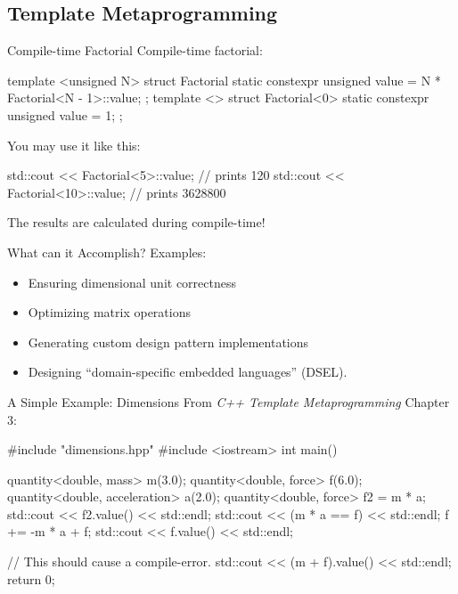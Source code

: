 \subsection{Template Metaprogramming}

\begin{frame}[fragile]{Compile-time Factorial}
    Compile-time factorial:
    \begin{cpp}
template <unsigned N>
struct Factorial {
  static constexpr unsigned value
      = N * Factorial<N - 1>::value;
};
template <>
struct Factorial<0> {
  static constexpr unsigned value = 1;
};
    \end{cpp}
    You may use it like this:
    \begin{cpp}
std::cout << Factorial<5>::value;  // prints 120
std::cout << Factorial<10>::value; // prints 3628800
    \end{cpp}
    The results are calculated during compile-time!
\end{frame}

\begin{frame}{What can it Accomplish?}
    Examples:
    \begin{itemize}
        \item Ensuring dimensional unit correctness
        \item Optimizing matrix operations
        \item Generating custom design pattern implementations
        \item Designing ``domain-specific embedded languages'' (DSEL).
    \end{itemize}
\end{frame}

\begin{frame}[fragile]{A Simple Example: Dimensions}
    From \textit{C++ Template Metaprogramming} Chapter 3:
    \begin{cpp}
#include "dimensions.hpp"
#include <iostream>
int main() {
    quantity<double, mass> m(3.0);
    quantity<double, force> f(6.0);
    quantity<double, acceleration> a(2.0);
    quantity<double, force> f2 = m * a;
    std::cout << f2.value() << std::endl;
    std::cout << (m * a == f) << std::endl;
    f += -m * a + f;
    std::cout << f.value() << std::endl;

    // This should cause a compile-error.
    std::cout << (m + f).value() << std::endl;
    return 0;
}
    \end{cpp}
\end{frame}